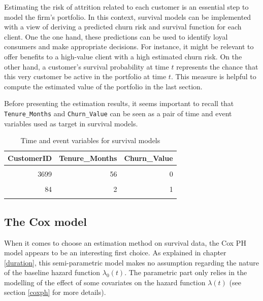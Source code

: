 \documentclass[
]{book}
\begin{document}
Estimating the risk of attrition related to each customer is an essential step to model the firm's portfolio. In this context, survival models can be implemented with a view of deriving a predicted churn risk and survival function for each client. One the one hand, these predictions can be used to identify loyal consumers and make appropriate decisions. For instance, it might be relevant to offer benefits to a high-value client with a high estimated churn risk. On the other hand, a customer's survival probability at time \(t\) represents the chance that this very customer be active in the portfolio at time \(t\). This measure is helpful to compute the estimated value of the portfolio in the last section.

Before presenting the estimation results, it seems important to recall that \texttt{Tenure\_Months} and \texttt{Churn\_Value} can be seen as a pair of time and event variables used as target in survival models.

\begin{table}[H]

\caption{\label{tab:survtarget}Time and event variables for survival models}
\centering
\begin{tabular}[t]{rrr}
\toprule
CustomerID & Tenure\_Months & Churn\_Value\\
\midrule
\cellcolor{gray!6}{233} & \cellcolor{gray!6}{10} & \cellcolor{gray!6}{1}\\
3699 & 56 & 0\\
\cellcolor{gray!6}{4324} & \cellcolor{gray!6}{66} & \cellcolor{gray!6}{0}\\
84 & 2 & 1\\
\cellcolor{gray!6}{893} & \cellcolor{gray!6}{3} & \cellcolor{gray!6}{1}\\
\bottomrule
\end{tabular}
\end{table}

\hypertarget{the-cox-model}{%
\subsection{The Cox model}\label{the-cox-model}}

When it comes to choose an estimation method on survival data, the Cox PH model appears to be an interesting first choice. As explained in chapter \ref{duration}, this semi-parametric model makes no assumption regarding the nature of the baseline hazard function \(\lambda_0(t)\). The parametric part only relies in the modelling of the effect of some covariates on the hazard function \(\lambda(t)\) (see section \ref{coxph} for more details).
\end{document}
